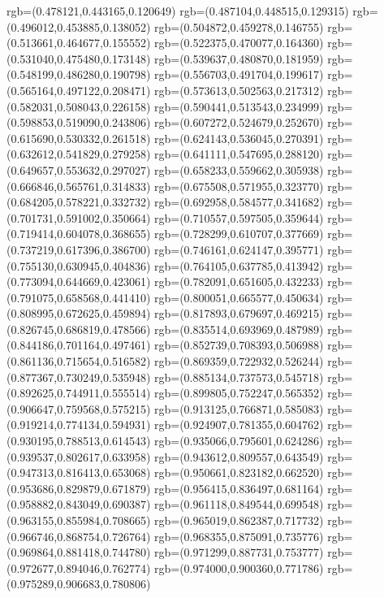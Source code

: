 {{{			rgb=(0.478121,0.443165,0.120649)
			rgb=(0.487104,0.448515,0.129315)
			rgb=(0.496012,0.453885,0.138052)
			rgb=(0.504872,0.459278,0.146755)
			rgb=(0.513661,0.464677,0.155552)
			rgb=(0.522375,0.470077,0.164360)
			rgb=(0.531040,0.475480,0.173148)
			rgb=(0.539637,0.480870,0.181959)
			rgb=(0.548199,0.486280,0.190798)
			rgb=(0.556703,0.491704,0.199617)
			rgb=(0.565164,0.497122,0.208471)
			rgb=(0.573613,0.502563,0.217312)
			rgb=(0.582031,0.508043,0.226158)
			rgb=(0.590441,0.513543,0.234999)
			rgb=(0.598853,0.519090,0.243806)
			rgb=(0.607272,0.524679,0.252670)
			rgb=(0.615690,0.530332,0.261518)
			rgb=(0.624143,0.536045,0.270391)
			rgb=(0.632612,0.541829,0.279258)
			rgb=(0.641111,0.547695,0.288120)
			rgb=(0.649657,0.553632,0.297027)
			rgb=(0.658233,0.559662,0.305938)
			rgb=(0.666846,0.565761,0.314833)
			rgb=(0.675508,0.571955,0.323770)
			rgb=(0.684205,0.578221,0.332732)
			rgb=(0.692958,0.584577,0.341682)
			rgb=(0.701731,0.591002,0.350664)
			rgb=(0.710557,0.597505,0.359644)
			rgb=(0.719414,0.604078,0.368655)
			rgb=(0.728299,0.610707,0.377669)
			rgb=(0.737219,0.617396,0.386700)
			rgb=(0.746161,0.624147,0.395771)
			rgb=(0.755130,0.630945,0.404836)
			rgb=(0.764105,0.637785,0.413942)
			rgb=(0.773094,0.644669,0.423061)
			rgb=(0.782091,0.651605,0.432233)
			rgb=(0.791075,0.658568,0.441410)
			rgb=(0.800051,0.665577,0.450634)
			rgb=(0.808995,0.672625,0.459894)
			rgb=(0.817893,0.679697,0.469215)
			rgb=(0.826745,0.686819,0.478566)
			rgb=(0.835514,0.693969,0.487989)
			rgb=(0.844186,0.701164,0.497461)
			rgb=(0.852739,0.708393,0.506988)
			rgb=(0.861136,0.715654,0.516582)
			rgb=(0.869359,0.722932,0.526244)
			rgb=(0.877367,0.730249,0.535948)
			rgb=(0.885134,0.737573,0.545718)
			rgb=(0.892625,0.744911,0.555514)
			rgb=(0.899805,0.752247,0.565352)
			rgb=(0.906647,0.759568,0.575215)
			rgb=(0.913125,0.766871,0.585083)
			rgb=(0.919214,0.774134,0.594931)
			rgb=(0.924907,0.781355,0.604762)
			rgb=(0.930195,0.788513,0.614543)
			rgb=(0.935066,0.795601,0.624286)
			rgb=(0.939537,0.802617,0.633958)
			rgb=(0.943612,0.809557,0.643549)
			rgb=(0.947313,0.816413,0.653068)
			rgb=(0.950661,0.823182,0.662520)
			rgb=(0.953686,0.829879,0.671879)
			rgb=(0.956415,0.836497,0.681164)
			rgb=(0.958882,0.843049,0.690387)
			rgb=(0.961118,0.849544,0.699548)
			rgb=(0.963155,0.855984,0.708665)
			rgb=(0.965019,0.862387,0.717732)
			rgb=(0.966746,0.868754,0.726764)
			rgb=(0.968355,0.875091,0.735776)
			rgb=(0.969864,0.881418,0.744780)
			rgb=(0.971299,0.887731,0.753777)
			rgb=(0.972677,0.894046,0.762774)
			rgb=(0.974000,0.900360,0.771786)
			rgb=(0.975289,0.906683,0.780806)
}}}
